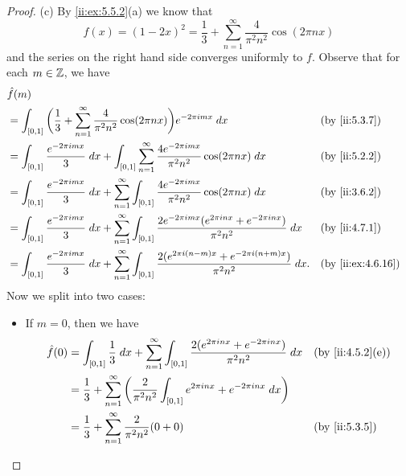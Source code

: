 \begin{proof}{(c)}
  By \cref{ii:ex:5.5.2}(a) we know that
  \[
    f(x) = (1 - 2x)^2 = \dfrac{1}{3} + \sum_{n = 1}^\infty \dfrac{4}{\pi^2 n^2} \cos(2 \pi n x)
  \]
  and the series on the right hand side converges uniformly to \(f\).
  Observe that for each \(m \in \mathbb{Z}\), we have
  \begin{align*}
     & \hat{f}(m)                                                                                                                                                                                       \\
     & = \int_{[0, 1]} \bigg(\dfrac{1}{3} + \sum_{n = 1}^\infty \dfrac{4}{\pi^2 n^2} \cos(2 \pi n x)\bigg) e^{-2 \pi i m x} \; dx                                                &  & \by{ii:5.3.7}     \\
     & = \int_{[0, 1]} \dfrac{e^{- 2 \pi i m x}}{3} \; dx + \int_{[0, 1]} \sum_{n = 1}^\infty \dfrac{4 e^{- 2 \pi i m x}}{\pi^2 n^2} \cos(2 \pi n x) \; dx                       &  & \by{ii:5.2.2}     \\
     & = \int_{[0, 1]} \dfrac{e^{- 2 \pi i m x}}{3} \; dx + \sum_{n = 1}^\infty \int_{[0, 1]} \dfrac{4 e^{- 2 \pi i m x}}{\pi^2 n^2} \cos(2 \pi n x) \; dx                       &  & \by{ii:3.6.2}     \\
     & = \int_{[0, 1]} \dfrac{e^{- 2 \pi i m x}}{3} \; dx + \sum_{n = 1}^\infty \int_{[0, 1]} \dfrac{2 e^{- 2 \pi i m x} (e^{2 \pi i n x} + e^{- 2 \pi i n x})}{\pi^2 n^2} \; dx &  & \by{ii:4.7.1}     \\
     & = \int_{[0, 1]} \dfrac{e^{- 2 \pi i m x}}{3} \; dx + \sum_{n = 1}^\infty \int_{[0, 1]} \dfrac{2 (e^{2 \pi i (n - m) x} + e^{- 2 \pi i (n + m) x})}{\pi^2 n^2} \; dx.      &  & \by{ii:ex:4.6.16}
  \end{align*}
  Now we split into two cases:
  \begin{itemize}
    \item If \(m = 0\), then we have
          \begin{align*}
            \hat{f}(0) & = \int_{[0, 1]} \dfrac{1}{3} \; dx + \sum_{n = 1}^\infty \int_{[0, 1]} \dfrac{2 (e^{2 \pi i n x} + e^{- 2 \pi i n x})}{\pi^2 n^2} \; dx &  & \by{ii:4.5.2}[e] \\
                       & = \dfrac{1}{3} + \sum_{n = 1}^\infty \bigg(\dfrac{2}{\pi^2 n^2} \int_{[0, 1]} e^{2 \pi i n x} + e^{- 2 \pi i n x} \; dx\bigg)                                 \\
                       & = \dfrac{1}{3} + \sum_{n = 1}^\infty \dfrac{2}{\pi^2 n^2} (0 + 0)                                                                       &  & \by{ii:5.3.5}    \\

\end{align*}
\end{itemize}
\end{proof}
